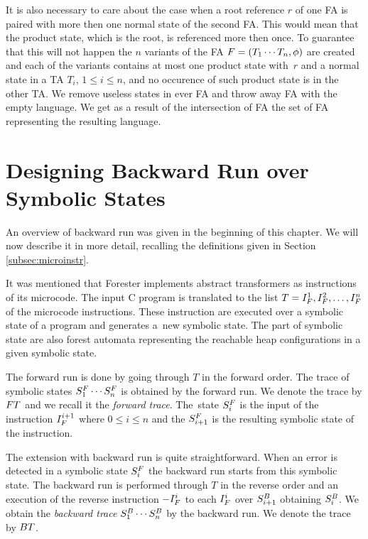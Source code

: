 It is also necessary to care about the case when a root reference $r$ of one FA
is paired with more then one normal state of the second FA.
This would mean that the product state, which is the root,
is referenced more then once.
To guarantee that this will not happen
the $n$ variants of the FA $F=(T_1 \cdots T_n, \phi)$ are created and each of the variants
contains at most one product state with~$r$ and a normal state
in a TA $T_i$, $1 \leq i \leq n$, and
no occurence of such product state is in the other TA.
We remove useless states in ever FA and throw away FA with the empty language.
We get as a result of the intersection of FA the set of FA representing
the resulting language.

\section{Designing Backward Run over Symbolic States}
\label{sec:brdesign}

An overview of backward run was given in the beginning of this chapter.
We will now describe it in more detail, recalling the definitions given in Section \ref{subsec:microinstr}.

It was mentioned that Forester implements abstract
transformers as instructions of its microcode.
The input C program is translated to the list $T=I^{1}_{F}, I^{2}_{F},\ldots, I^{n}_{F}$
of the microcode instructions.
These instruction are executed over a symbolic state of a program
and generates a~new symbolic state.
The part of symbolic state are also forest automata representing
the reachable heap configurations in a given symbolic state.

The forward run is done by going through $T$ in the forward order.
The trace of symbolic states $S^{F}_1 \cdots S^{F}_n$ is obtained by the forward run.
We denote the trace by $FT$ and we recall it the \emph{forward trace}.
The~state $S^{F}_{i}$ is the input of the instruction $I^{i+1}_{F}$
where $ 0 \leq i \leq n$ and the $S^{F}_{i+1}$ is the resulting symbolic state
of the instruction.

The extension with backward run is quite straightforward.
When an error is detected in a symbolic state $S^{F}_{i}$
the backward run starts from this symbolic state.
The backward run is performed through $T$ in the reverse order
and an execution of the reverse instruction $-I_{F}^{i}$ to each $I^{i}_{F}$
over $S^{B}_{i+1}$ obtaining $S^{B}_{i}$.
We obtain the \emph{backward trace} $S^{B}_1 \cdots S^{B}_n$ by the backward run.
We denote the trace by $BT$.

